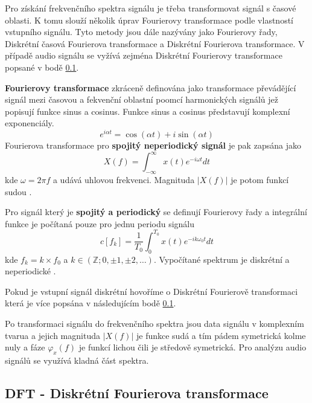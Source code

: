   Pro získání frekvenčního spektra signálu je třeba transformovat signál s časové oblasti. K tomu slouží několik úprav Fourierovy transformace podle vlastností vstupního signálu. Tyto metody jsou dále nazývány jako Fourierovy řady, Diskrétní časová Fourierova transformace a Diskrétní Fourierova transformace. V případě audio signálu se vyžívá zejména Diskrétní Fourierovy transformace popsané v bodě \ref{sec:DFT}.

  \textbf{Fourierovy transformace} zkráceně definována jako transformace převádějící signál mezi časovou a fekvenční oblastní poomcí harmonických signálů jež popisují funkce sinus a cosinus.\cite{bracewell1978fourier} Funkce sinus a cosinus představují komplexní exponenciály.
  \begin{equation}
    e^{i\alpha t} = \cos(\alpha t) + i \sin(\alpha t)
  \end{equation}
  Fourierova transformace pro \textbf{ spojitý neperiodický signál} je pak zapsána jako
  \begin{equation}
    X(f) = \int_{-\infty}^{\infty} x(t) e^{-i\omega t} dt
  \end{equation}
  kde $\omega = 2\pi f$ a udává uhlovou frekvenci. Magnituda $|X(f)|$ je potom funkcí sudou \cite{sneddon1995fourier}.

  Pro signál který je \textbf{spojitý a periodický} se definují Fourierovy řady a integrální funkce je počítaná pouze pro jednu periodu signálu
  \begin{equation}
    c[f_k] = \frac{1}{T_0} \int_{0}^{T_0} x(t) e^{-i k \omega_0 t} dt
  \end{equation}
  kde $f_k = k \times f_0$ a $k \in (\mathbb{Z}; 0, \pm 1, \pm 2, \dots)$. Vypočítané spektrum je diskrétní a neperiodické \cite{sneddon1995fourier}.

  Pokud je vstupní signál diskrétní hovoříme o Diskrétní Fourierově transformaci která je více popsána v následujícím bodě \ref{sec:DFT}.

 Po transformaci signálu do frekvenčního spektra jsou data signálu v komplexním tvarua a jejich magnituda $|X(f)|$ je funkce sudá a tím pádem symetrická kolme nuly a fáze $\varphi_x(f)$ je funkcí lichou čili je středově symetrická. Pro analýzu audio signálů se využívá kladná část spektra.

  \subsection{DFT - Diskrétní Fourierova transformace} \label{sec:DFT}

